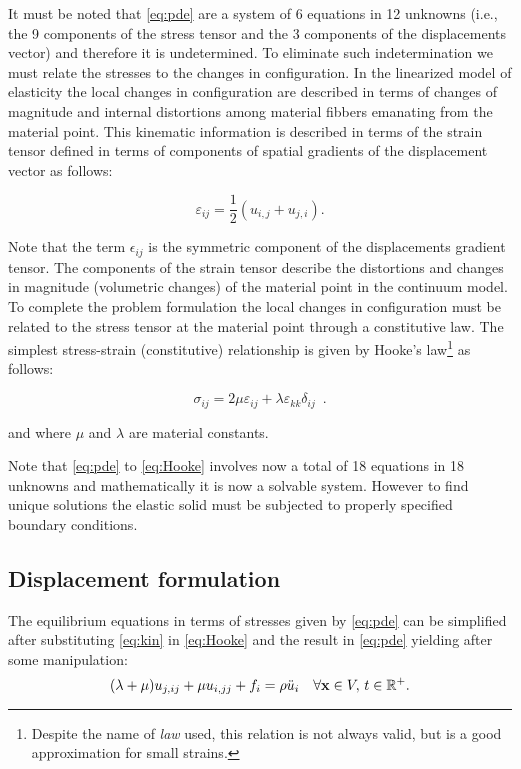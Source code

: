 It must be noted that \cref{eq:pde} are a system of 6 equations in 12 unknowns (i.e., the 9 components of the stress tensor and the 3 components of the displacements vector) and therefore it is undetermined. To eliminate such indetermination we must relate the stresses to the changes in configuration. In the linearized model of elasticity the local changes in configuration are described in terms of changes of magnitude and internal distortions among material fibbers emanating from the material point. This kinematic information is described in terms of the strain tensor defined in terms of components of spatial gradients of the displacement vector as follows:


\begin{equation}\label{eq:kin}
\varepsilon_{ij} = \frac{1}{2}(u_{i,j} + u_{j,i}).
\end{equation}

Note that the term $\epsilon_{ij}$ is the symmetric component of the displacements gradient tensor. The components of the strain tensor describe the distortions and changes in magnitude (volumetric changes) of the material point in the continuum model. To complete the problem formulation the local changes in configuration must be related to the stress tensor at the material point through a constitutive law. The simplest stress-strain (constitutive) relationship is given by Hooke's law\footnote{Despite the name of \emph{law} used, this relation is not always valid, but is a good approximation for small strains.} as follows:

\begin{equation} \label{eq:Hooke}
\sigma_{ij} = 2\mu \varepsilon_{ij} + \lambda \varepsilon_{kk}\delta_{ij} \enspace .
\end{equation}

and where $\mu$ and $\lambda$ are material constants.

Note that \cref{eq:pde} to \cref{eq:Hooke} involves now a total of 18 equations in 18 unknowns and mathematically it is now a solvable system. However to find unique solutions the elastic solid must be subjected to properly specified boundary conditions.

\subsection{Displacement formulation}
The equilibrium equations in terms of stresses given by \cref{eq:pde} can be simplified after substituting \cref{eq:kin} in \cref{eq:Hooke} and the result in \cref{eq:pde} yielding after some manipulation:
\begin{equation} \label{eq:navier}
(\lambda  + \mu)u_{j,ij} + \mu u_{i,jj} + {f_i} = \rho \ddot{u}_i \quad \forall \vb{x} \in V,\, t \in \mathbb{R}^{+}.
\end{equation}

